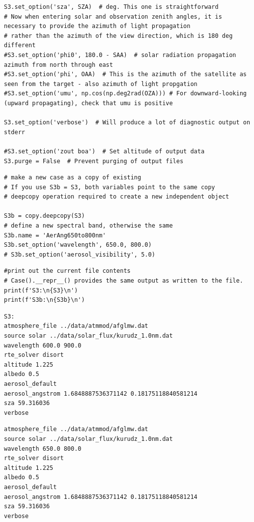 \begin{lstlisting}[style=tinysize]
S3.set_option('sza', SZA)  # deg. This one is straightforward
# Now when entering solar and observation zenith angles, it is necessary to provide the azimuth of light propagation
# rather than the azimuth of the view direction, which is 180 deg different
#S3.set_option('phi0', 180.0 - SAA)  # solar radiation propagation azimuth from north through east
#S3.set_option('phi', OAA)  # This is the azimuth of the satellite as seen from the target - also azimuth of light propgation
#S3.set_option('umu', np.cos(np.deg2rad(OZA))) # For downward-looking (upward propagating), check that umu is positive

S3.set_option('verbose')  # Will produce a lot of diagnostic output on stderr

#S3.set_option('zout boa')  # Set altitude of output data
S3.purge = False  # Prevent purging of output files

\end{lstlisting}


\begin{lstlisting}[style=tinysize]
# make a new case as a copy of existing
# If you use S3b = S3, both variables point to the same copy
# deepcopy operation required to create a new independent object

S3b = copy.deepcopy(S3)
# define a new spectral band, otherwise the same
S3b.name = 'AerAng650to800nm'
S3b.set_option('wavelength', 650.0, 800.0)
# S3b.set_option('aerosol_visibility', 5.0)
\end{lstlisting}


\begin{lstlisting}[style=tinysize]
#print out the current file contents
# Case().__repr__() provides the same output as written to the file.
print(f'S3:\n{S3}\n')
print(f'S3b:\n{S3b}\n')
\end{lstlisting}


\begin{lstlisting}[style=outcellstyle]
S3:
atmosphere_file ../data/atmmod/afglmw.dat
source solar ../data/solar_flux/kurudz_1.0nm.dat
wavelength 600.0 900.0
rte_solver disort
altitude 1.225
albedo 0.5
aerosol_default 
aerosol_angstrom 1.6848887536371142 0.18175118840581214
sza 59.316036
verbose 

\end{lstlisting}



\begin{lstlisting}[style=outcellstyle]
atmosphere_file ../data/atmmod/afglmw.dat
source solar ../data/solar_flux/kurudz_1.0nm.dat
wavelength 650.0 800.0
rte_solver disort
altitude 1.225
albedo 0.5
aerosol_default 
aerosol_angstrom 1.6848887536371142 0.18175118840581214
sza 59.316036
verbose 
\end{lstlisting}


